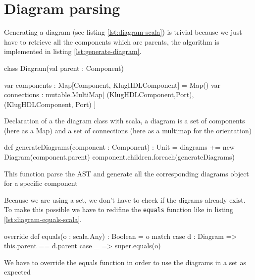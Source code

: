 \section{Diagram parsing}
\label{sec:diagrams-parsing}

Generating a diagram (see listing \ref{lst:diagram-scala}) is trivial because we
just have to retrieve all the components which are parents, the algorithm is
implemented in listing \ref{lst:generate-diagram}. 
\begin{listing}[H]
  \centering
  \begin{scalacode}
    class Diagram(val parent : Component) {

      var components : Map[Component, KlugHDLComponent] = Map()
      var connections : mutable.MultiMap[
          (KlugHDLComponent,Port),
          (KlugHDLComponent, Port)
        ]
      }
  \end{scalacode}
  \caption[Diagram class declaration]{Declaration of a the diagram class with
    scala, a diagram is a set of components (here as a Map) and a set of
    connections (here as a multimap for the orientation)}
  \label{lst:diagram-scala}
\end{listing}

\begin{listing}[H]
  \centering
  \begin{scalacode}
  def generateDiagrams(component : Component) : Unit = {
    diagrams += new Diagram(component.parent)
    component.children.foreach(generateDiagrams)
  }
  \end{scalacode}
  \caption[Parsing the diagrams form the AST]{This function parse the AST and
    generate all the corresponding diagrams object for a specific component}
  \label{lst:generate-diagram}
\end{listing}

Because we are using a set,
we don't have to check if the digrams already exist. To make this possible we
have to redifine the \verb|equals| function like in listing \ref{lst:diagram-equals-scala}.

\begin{listing}[H]
  \centering
  \begin{scalacode}
  override def equals(o : scala.Any) : Boolean = o match {
    case d : Diagram => this.parent == d.parent
    case _ => super.equals(o)
  }
  \end{scalacode}
  \caption[Equals function implementation for the Diagram Class]{We have to
    override the equals function in order to use the diagrams in a set as expected}
  \label{lst:diagram-equals-scala}
\end{listing}

